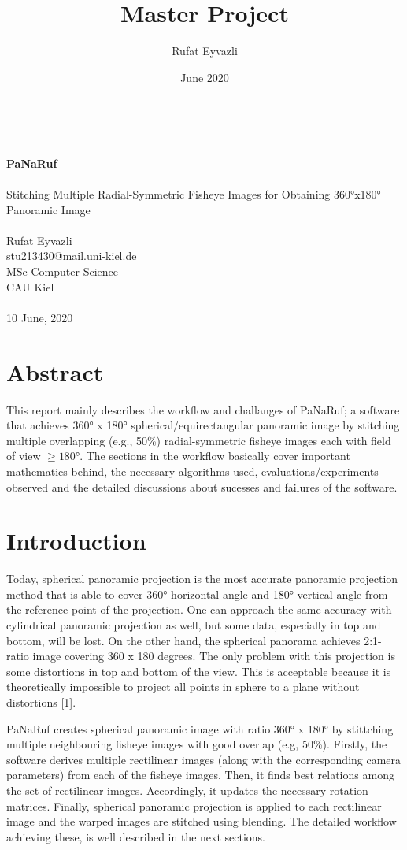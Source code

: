 \documentclass{article}
\title{Master Project}
\author{Rufat Eyvazli }
\date{June 2020}
\begin{document}
\begin{title} \\
    \begin{center} 
         \textbf{PaNaRuf}\\~\\
 		 Stitching Multiple Radial-Symmetric Fisheye Images for Obtaining \ang{360}x\ang{180} Panoramic Image\\~\\
        
    Rufat Eyvazli\\
    stu213430@mail.uni-kiel.de\\
    MSc Computer Science\\
    CAU Kiel \\~\\
    10 June, 2020
    \end{center}
\end{title}
\section*{Abstract} This report mainly describes the workflow and challanges of PaNaRuf; a software that achieves \ang{360} x \ang{180} spherical/equirectangular panoramic image by stitching multiple overlapping (e.g., 50\%) radial-symmetric fisheye images each with field of view $\geq \ang{180}$. The sections in the workflow basically cover important mathematics behind, the necessary algorithms used, evaluations/experiments observed and the detailed discussions about sucesses and failures of the software. 

\section*{Introduction}
Today, spherical panoramic projection is the most accurate panoramic projection method that is able to cover \ang{360} horizontal angle and \ang{180} vertical angle from the reference point of the projection. One can approach the same accuracy with cylindrical panoramic projection as well, but some data, especially in top and bottom, will be lost. On the other hand, the spherical panorama achieves 2:1-ratio image covering 360 x 180 degrees. The only problem with this projection is some distortions in top and bottom of the view. This is acceptable because it is theoretically impossible to project all points in sphere to a plane without distortions [1].

PaNaRuf creates spherical panoramic image with ratio \ang{360} x \ang{180} by stittching multiple neighbouring fisheye images with good overlap (e.g, 50\%). Firstly, the software derives multiple rectilinear images (along with the corresponding camera parameters) from each of the fisheye images. Then, it finds best relations among the set of rectilinear images. Accordingly, it updates the necessary rotation matrices. Finally, spherical panoramic projection is applied to each rectilinear image and the warped images are stitched using blending. The detailed workflow achieving these, is well described in the next sections. \\~\\
\end{document}
